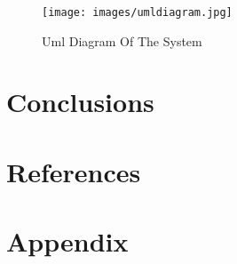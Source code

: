 \documentclass[12pt]{article}
\begin{document}
 	\begin{figure}[h]
 		\centering
 		\label{Uml Diagram Of The System}
 		\texttt{[image: images/umldiagram.jpg]}\\[0.5 cm]	
 		\caption{Uml Diagram Of The System} 		
 	\end{figure}
	\section{Conclusions}
	
	\section{References}
	
	\section{Appendix}


	
	
\end{document}
